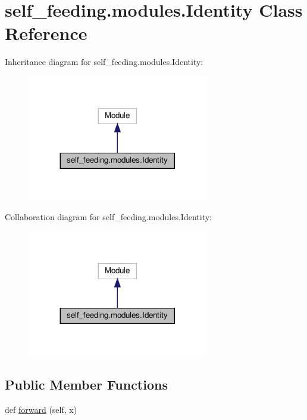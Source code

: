 \hypertarget{classself__feeding_1_1modules_1_1Identity}{}\section{self\+\_\+feeding.\+modules.\+Identity Class Reference}
\label{classself__feeding_1_1modules_1_1Identity}


Inheritance diagram for self\+\_\+feeding.\+modules.\+Identity\+:
\nopagebreak
\begin{figure}[H]
\begin{center}
\leavevmode
\includegraphics[width=224pt]{classself__feeding_1_1modules_1_1Identity__inherit__graph}
\end{center}
\end{figure}


Collaboration diagram for self\+\_\+feeding.\+modules.\+Identity\+:
\nopagebreak
\begin{figure}[H]
\begin{center}
\leavevmode
\includegraphics[width=224pt]{classself__feeding_1_1modules_1_1Identity__coll__graph}
\end{center}
\end{figure}
\subsection*{Public Member Functions}
\begin{DoxyCompactItemize}
\item 
def \hyperlink{classself__feeding_1_1modules_1_1Identity_ad2c920f8e5ba56e8d81483e89be517b4}{forward} (self, x)
\end{DoxyCompactItemize}


